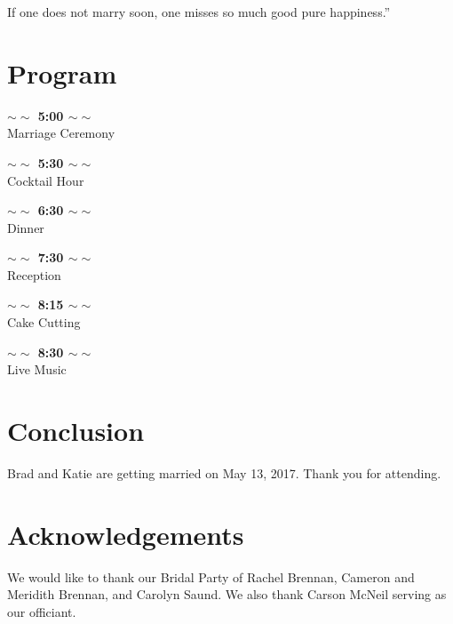 \documentclass[letterpaper, 11 pt, conference]{ieeeconf}
\newcommand{\programSpace}{\vspace{0.2in}}
\newcommand{\programTime}[1]{\textbf{$\sim\sim$ #1 $\sim\sim$}}
\begin{document}
If one does not marry soon, one misses so much good pure happiness.''\cite{Darwin}


\vspace{1.5in}

\section{Program}
\programSpace
\begin{center}
  \programTime{5:00}\\
  Marriage Ceremony\\
  \programSpace

  \programTime{5:30}\\
  Cocktail Hour\\
  \programSpace

  \programTime{6:30}\\
  Dinner\\
  \programSpace

  \programTime{7:30}\\
  Reception
  \programSpace

  \programTime{8:15}\\
  Cake Cutting
  \programSpace

  \programTime{8:30}\\
  Live Music
  \programSpace

\end{center}
\section{Conclusion}
Brad and Katie are getting married on May 13, 2017.
Thank you for attending.

\section{Acknowledgements}
We would like to thank our Bridal Party of Rachel Brennan, Cameron and Meridith Brennan, and Carolyn Saund.
We also thank Carson McNeil serving as our officiant.



\end{document}
